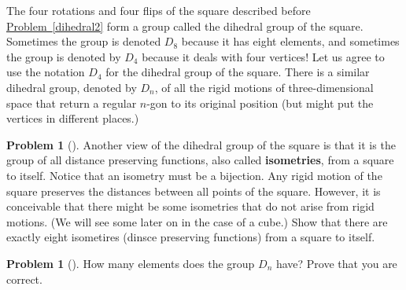 \documentclass[10pt,]{book}
\newcommand{\terminology}[1]{\textbf{#1}}
\theoremstyle{plain}
\theoremstyle{definition}
\newtheorem{activity}[project]{Problem}
\theoremstyle{definition}
\numberwithin{equation}{chapter}
\begin{document}
The four rotations and four flips of the square described before \hyperref[dihedral2]{Problem~\ref{dihedral2}} form a group called the dihedral group of the square. Sometimes the group is denoted \(D_8\) because it has eight elements, and sometimes the group is denoted by \(D_4\) because it deals with four vertices! Let us agree to use the notation \(D_4\) for the dihedral group of the square. There is a similar dihedral group, denoted by \(D_{n}\), of all the rigid motions of three-dimensional space that return a regular \(n\)-gon to its original position (but might put the vertices in different places.)%
\begin{activity}[]\marginsymbol[-1em]{} \label{activity-261}
Another view of the dihedral group of the square is that it is the group of all distance preserving functions, also called \terminology{isometries},  from a square to itself.  Notice that an isometry must be a bijection.  Any rigid motion of the square preserves the distances between all points of the square.  However, it is conceivable that there might be some isometries that do not arise from rigid motions.  (We will see some later on in the case of a cube.)  Show that there are exactly eight isometires (dinsce preserving functions) from a square to itself.%
\end{activity}
\begin{activity}[]\marginsymbol[-1em]{} \label{activity-262}
How many elements does the group \(D_n\) have? Prove that you are correct.%
\end{activity}
\end{document}
